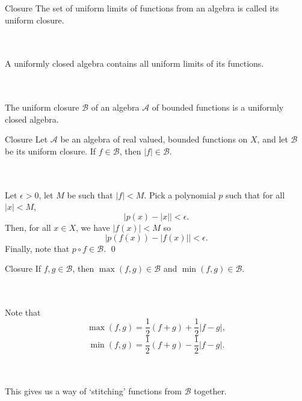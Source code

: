\documentclass{beamer}
\begin{document}
    \begin{frame}{Closure}
        The set of uniform limits of functions from an algebra is called its uniform
        closure.

        \\~\\

        A uniformly closed algebra contains all uniform limits of its functions.

        \\~\\

        The uniform closure $\mathscr{B}$ of an algebra $\mathscr{A}$ of bounded
        functions is a uniformly closed algebra.
    \end{frame}

    \begin{frame}{Closure}
        Let $\mathscr{A}$ be an algebra of real valued, bounded functions on $X$, and
        let $\mathscr{B}$ be its uniform closure. If $f \in \mathscr{B}$, then $|f|
        \in \mathscr{B}$.

        \\~\\

        Let $\epsilon > 0$, let $M$ be such that $|f| < M$. Pick a polynomial $p$
        such that for all $|x| < M$, \[
            |p(x) - |x| | < \epsilon.
        \] Then, for all $x \in X$, we have $|f(x)| < M$ so \[
            |p(f(x)) - |f(x)| | < \epsilon.
        \] Finally, note that $p\circ f \in \mathscr{B}$. \hfill\qed
    \end{frame}

    \begin{frame}{Closure}
        If $f, g \in \mathscr{B}$, then $\max(f, g) \in \mathscr{B}$ and $\min(f, g)
        \in \mathscr{B}$.

        \\~\\

        Note that \[
            \max(f, g) = \frac{1}{2}(f + g) + \frac{1}{2}|f - g|,
        \] \[
            \min(f, g) = \frac{1}{2}(f + g) - \frac{1}{2}|f - g|. \tag*{\qed}
        \]

        \\~\\

        This gives us a way of `stitching' functions from $\mathscr{B}$ together.
    \end{frame}
\end{document}
